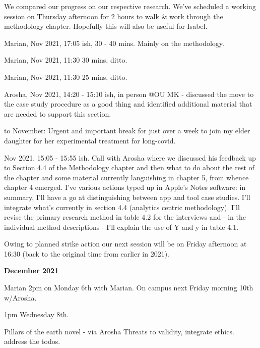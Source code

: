We compared our progress on our respective research. We've scheduled a working session on Thursday afternoon for 2 hours to walk \& work through the methodology chapter. Hopefully this will also be useful for Isabel.

\dotfill

Marian,  Nov 2021, 17:05 ish, 30 - 40 mins. Mainly on the methodology.

\dotfill

Marian,  Nov 2021, 11:30 30 mins, ditto. 

\dotfill

Marian,  Nov 2021, 11:30 25 mins, ditto. 

\dotfill

Arosha,  Nov 2021, 14:20 - 15:10 ish, in person @OU MK - discussed the move to the case study procedure as a good thing and identified additional material that are needed to support this section. 

\dotfill

 to  November: Urgent and important break for just over a week to join my elder daughter for her experimental treatment for long-covid.

\dotfill

 Nov 2021, 15:05 - 15:55 ish. Call with Arosha where we discussed his feedback up to Section 4.4 of the Methodology chapter and then what to do about the rest of the chapter and some material currently languishing in chapter 5, from whence chapter 4 emerged. I've various actions typed up in Apple's Notes software: in summary, I'll have a go at distinguishing between app and tool case studies. I'll integrate what's currently in section 4.4 (analytics centric methodology). I'll revise the primary research method in table 4.2 for the interviews and - in the individual method descriptions - I'll explain the use of Y and y in table 4.1.

Owing to planned strike action our next session will be on Friday afternoon at 16:30 (back to the original time from earlier in 2021).

\clearpage

\textbf{December 2021} \dotfill

Marian 2pm on Monday 6th with Marian.
On campus next Friday morning 10th w/Arosha.

1pm Wednesday 8th. 

Pillars of the earth novel - via Arosha
Threats to validity, integrate ethics. address the todos. 

